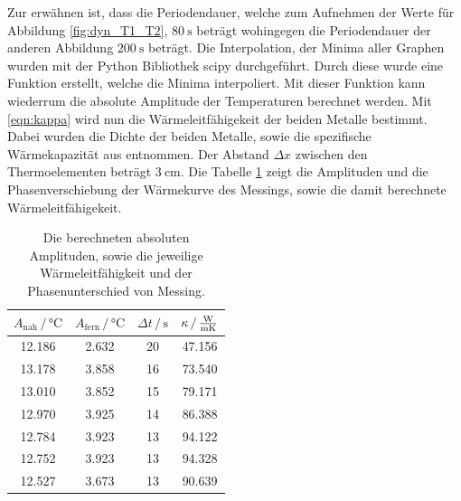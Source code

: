 
Zur erwähnen ist, dass die Periodendauer, welche zum Aufnehmen der Werte für Abbildung \ref{fig:dyn_T1_T2}, $\SI{80}{\second}$ beträgt wohingegen die Periodendauer der anderen Abbildung $\SI{200}{\second}$ beträgt.
Die Interpolation, der Minima aller Graphen wurden mit der Python Bibliothek scipy \cite{scipy} durchgeführt.
Durch diese wurde eine Funktion erstellt, welche die Minima interpoliert.
Mit dieser Funktion kann wiederrum die absolute Amplitude der Temperaturen berechnet werden.
Mit \eqref{eqn:kappa} wird nun die Wärmeleitfähigekeit der beiden Metalle bestimmt.
Dabei wurden die Dichte der beiden Metalle, sowie die spezifische Wärmekapazität aus \cite{anleitung} entnommen.
Der Abstand $\Delta x$ zwischen den Thermoelementen beträgt $\SI{3}{\centi\meter}$.
Die Tabelle \ref{tab:erg_mess} zeigt die Amplituden und die Phasenverschiebung der Wärmekurve des Messings, sowie die damit berechnete Wärmeleitfähigekeit.
\begin{table}
\centering
\caption{Die berechneten absoluten Amplituden, sowie die jeweilige Wärmeleitfähigkeit und der Phasenunterschied von Messing.}
\begin{tabular}{cccc}    
    \toprule
    $A_\text{nah} \,/\, \si{\celsius}$ & $A_\text{fern} \,/\, \si{\celsius}$ & $\Delta t \,/\, \si{\second}$ & $\kappa \, / \, \si{\frac{\watt}{\meter\kelvin}}$ \\
    \midrule
    12.186 & 2.632 & 20 & 47.156 \\
    13.178 & 3.858 & 16 & 73.540 \\
    13.010 & 3.852 & 15 & 79.171 \\
    12.970 & 3.925 & 14 & 86.388 \\
    12.784 & 3.923 & 13 & 94.122 \\
    12.752 & 3.923 & 13 & 94.328 \\
    12.527 & 3.673 & 13 & 90.639 \\
    \bottomrule
\end{tabular}
\label{tab:erg_mess}
\end{table}

